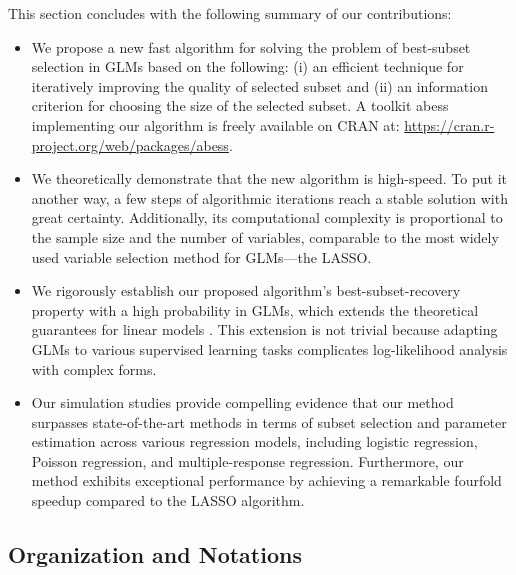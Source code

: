This section concludes with the following summary of our contributions:
\begin{itemize}
\item We propose a new fast algorithm for solving the problem of best-subset selection in GLMs based on the following:
(i) an efficient technique for iteratively improving the quality of selected subset and
(ii) an information criterion for choosing the size of the selected subset.
A toolkit \textsf{abess} implementing our algorithm is freely available on CRAN at: \url{https://cran.r-project.org/web/packages/abess}.
\item We theoretically demonstrate that the new algorithm is high-speed.
To put it another way, a few steps of algorithmic iterations reach a stable solution with great certainty.
Additionally, its computational complexity is proportional to the sample size and the number of variables, comparable to the most widely used variable selection method for GLMs---the LASSO.
\item We rigorously establish our proposed algorithm's best-subset-recovery property with a high probability in GLMs, which extends the theoretical guarantees for linear models \citep{zhu2020polynomial}. This extension is not trivial because adapting GLMs to various supervised learning tasks complicates log-likelihood analysis with complex forms.
\item Our simulation studies provide compelling evidence that our method surpasses state-of-the-art methods in terms of subset selection and parameter estimation across various regression models, including logistic regression, Poisson regression, and multiple-response regression. Furthermore, our method exhibits exceptional performance by achieving a remarkable fourfold speedup compared to the LASSO algorithm. %
\end{itemize}


\subsection{Organization and Notations}

